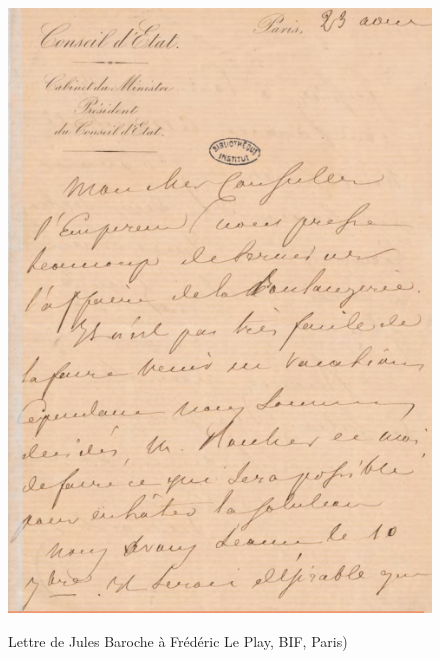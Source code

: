 \begin{figure}[ht]
    \centering
    \caption{Lettre de Jules Baroche à Frédéric Le Play, BIF, Paris)}
    \includegraphics[width=12cm]{images/SIM-MS6062-1Baroche.png}
    \label{SIM-MS6062-1Baroche}
\end{figure}
